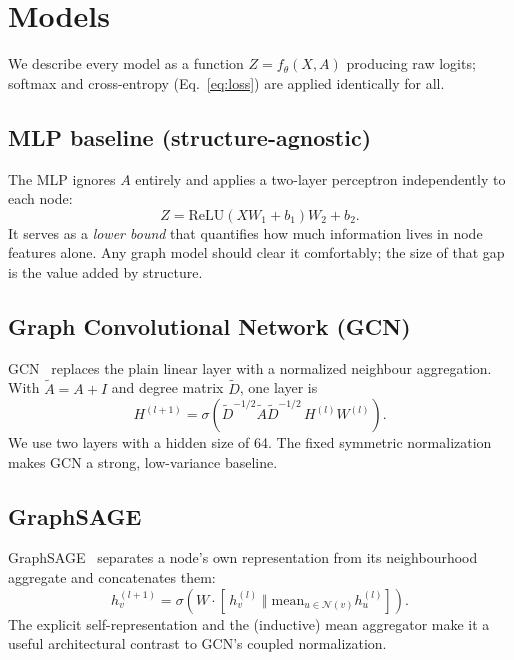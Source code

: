 \documentclass{article}
\begin{document}
\section{Models}
\label{sec:methods}

We describe every model as a function $Z = f_\theta(X, A)$ producing raw logits;
softmax and cross-entropy (Eq.~\ref{eq:loss}) are applied identically for all.

\subsection{MLP baseline (structure-agnostic)}
The MLP ignores $A$ entirely and applies a two-layer perceptron independently to
each node:
\begin{equation}
  Z = \mathrm{ReLU}\!\left(X W_1 + b_1\right) W_2 + b_2 .
\end{equation}
It serves as a \emph{lower bound} that quantifies how much information lives in node
features alone. Any graph model should clear it comfortably; the size of that gap is
the value added by structure.

\subsection{Graph Convolutional Network (GCN)}
GCN~\cite{kipf2017gcn} replaces the plain linear layer with a normalized neighbour
aggregation. With $\tilde{A} = A + I$ and degree matrix $\tilde{D}$, one layer is
\begin{equation}
  H^{(l+1)} = \sigma\!\left(\tilde{D}^{-1/2}\tilde{A}\tilde{D}^{-1/2}\, H^{(l)} W^{(l)}\right).
\end{equation}
We use two layers with a hidden size of 64. The fixed symmetric normalization makes
GCN a strong, low-variance baseline.

\subsection{GraphSAGE}
GraphSAGE~\cite{hamilton2017graphsage} separates a node's own representation from its
neighbourhood aggregate and concatenates them:
\begin{equation}
  h_v^{(l+1)} = \sigma\!\left(W \cdot \left[\, h_v^{(l)} \;\Vert\;
  \mathrm{mean}_{u \in \mathcal{N}(v)} h_u^{(l)} \right]\right).
\end{equation}
The explicit self-representation and the (inductive) mean aggregator make it a useful
architectural contrast to GCN's coupled normalization.
\end{document}
